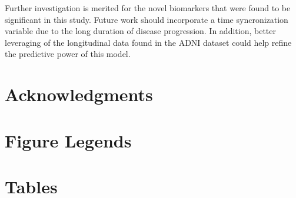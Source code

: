 \documentclass[10pt]{article}
\begin{document}
Further investigation is merited for the novel biomarkers that were found to be significant in this study.  Future work should incorporate a time syncronization variable due to the long duration of disease progression.  In addition, better leveraging of the longitudinal data found in the ADNI dataset could help refine the predictive power of this model.

\section*{Acknowledgments}




\section*{Figure Legends}

\section*{Tables}
\end{document}

